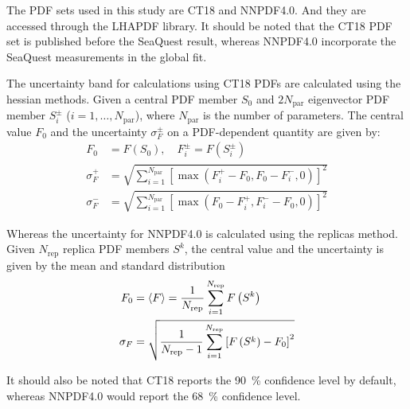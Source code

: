 \documentclass[../main.tex]{subfiles}
\begin{document}
The PDF sets used in this study are CT18\cite{hou2019} and NNPDF4.0\cite{ball2021}.
And they are accessed through the LHAPDF library\cite{buckley2015}. It should be noted
that the CT18 PDF set is published before the SeaQuest result, whereas NNPDF4.0
incorporate the SeaQuest measurements\cite{dove2021} in the global fit.

The uncertainty band for calculations using CT18 PDFs are calculated using the hessian methods.
Given a central PDF member $S_0$ and $2N_{\mathrm{par}}$ eigenvector PDF member $S^\pm_i$ ($i=1,\dots,N_{\mathrm{par}}$),
where $N_{\mathrm{par}}$ is the number of parameters. The central value $F_0$ and the uncertainty $\sigma^\pm_F$
on a PDF-dependent quantity are given by:
\begin{equation}
	\begin{split}
		F_0 &= F(S_0),\quad F_i^\pm=F(S_i^\pm) \\
		\sigma^+_F &= \sqrt{\sum_{i=1}^{N_{\mathrm{par}}} \left[\max\left(F_i^+ - F_0, F_0 - F^-_i,0\right)\right]^2 }\\
		\sigma^-_F &= \sqrt{\sum_{i=1}^{N_{\mathrm{par}}} \left[\max\left(F_0 - F^+_i, F_i^- - F_0,0\right)\right]^2 }
	\end{split}
\end{equation}

Whereas the uncertainty for NNPDF4.0 is calculated using the replicas method. Given $N_{\mathrm{rep}}$ replica
PDF members $S^k$, the central value and the uncertainty is given by the mean and standard distribution
\begin{equation}
	\begin{split}
		F_0&=\expval{F}=\frac{1}{N_{\mathrm{rep}}}\sum_{i=1}^{N_{\mathrm{rep}}}F\left(S^k\right)\\
		\sigma_F&= \sqrt{\frac{1}{N_{\mathrm{rep}}-1}\sum_{i=1}^{N_{\mathrm{rep}}}\left[F\left(S^k\right)-F_0\right]^2}
	\end{split}
\end{equation}

It should also be noted that CT18 reports the \SI{90}{\percent} confidence level by default, whereas NNPDF4.0
would report the \SI{68}{\percent} confidence level.

\ifSubfilesClassLoaded{ \printbibliography[heading=bibintoc,title={References}]}{}
\end{document}
